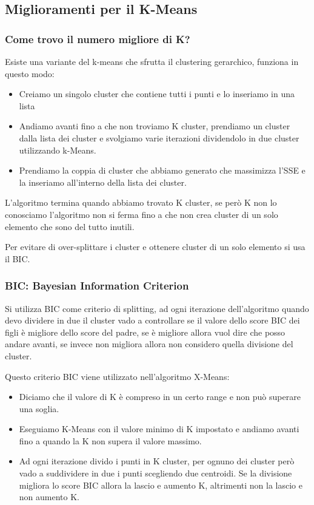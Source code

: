\documentclass[14pt]{extreport}
\begin{document}
\subsection{Miglioramenti per il K-Means}

\subsubsection{Come trovo il numero migliore di K?}

Esiste una variante del k-means che sfrutta il clustering gerarchico, funziona in questo modo:
\begin{itemize}
    \item Creiamo un singolo cluster che contiene tutti i punti e lo inseriamo in una lista
    \item Andiamo avanti fino a che non troviamo K cluster, prendiamo un cluster dalla lista dei cluster e svolgiamo varie iterazioni dividendolo in due cluster utilizzando k-Means. 
    \item Prendiamo la coppia di cluster che abbiamo generato che massimizza l'SSE e la inseriamo all'interno della lista dei cluster.
\end{itemize}

L'algoritmo termina quando abbiamo trovato K cluster, se però K non lo conosciamo l'algoritmo non si ferma fino a che non crea cluster di un solo elemento che sono del tutto inutili.

Per evitare di over-splittare i cluster e ottenere cluster di un solo elemento si usa il BIC.

\subsubsection{BIC: Bayesian Information Criterion}

Si utilizza BIC come criterio di splitting, ad ogni iterazione dell'algoritmo quando devo dividere in due il cluster vado a controllare se il valore dello score BIC dei figli è migliore dello score del padre, se è migliore allora vuol dire che posso andare avanti, se invece non migliora allora non considero quella divisione del cluster.

Questo criterio BIC viene utilizzato nell'algoritmo X-Means:
\begin{itemize}
    \item Diciamo che il valore di K è compreso in un certo range e non può superare una soglia.
    \item Eseguiamo K-Means con il valore minimo di K impostato e andiamo avanti fino a quando la K non supera il valore massimo. 
    \item Ad ogni iterazione divido i punti in K cluster, per ognuno dei cluster però vado a suddividere in due i punti scegliendo due centroidi. Se la divisione migliora lo score BIC allora la lascio e aumento K, altrimenti non la lascio e non aumento K.
\end{itemize}
\end{document}
